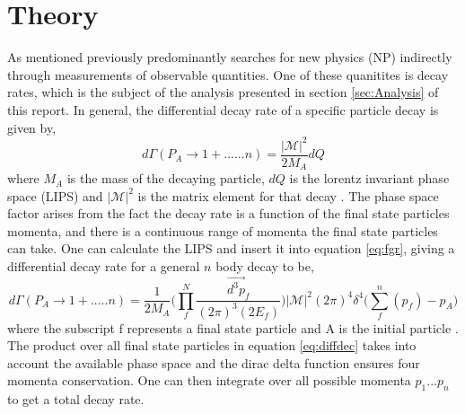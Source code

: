 
\section{Theory}
\label{sec:Theory}


As mentioned previously \lhcb predominantly searches for new physics (NP) indirectly through measurements of observable quantities.  One of these quanitites is decay rates, which is the subject of the analysis presented in section \ref{sec:Analysis} of this report.  In general, the differential decay rate of a specific particle decay is given by,
\begin{equation}
  \label{eq:fgr}
  d\Gamma(P_A\to1 + ......n) = \frac{|\mathscr{M}|^2}{2M_A}dQ
\end{equation}
where $M_A$ is the mass of the decaying particle, $dQ$ is the lorentz invariant phase space (LIPS) and $|\mathscr{M}|^2$ is the matrix element for that decay \cite{halzen1984quarks}.  The phase space factor arises from the fact the decay rate is a function of the final state particles momenta, and there is a continuous range of momenta the final state particles can take.  One can calculate the LIPS and insert it into equation \ref{eq:fgr}, giving a differential decay rate for a general $n$ body decay to be,
\begin{equation}
  \label{eq:diffdec}
  d\Gamma(P_A \to 1+ .....n) = \frac{1}{2M_A}\bigg(\prod_{f}^{N}\frac{\vec{d^3p}_f}{(2\pi)^3(2E_f)}\bigg)|\mathscr{M}|^2(2\pi)^4\delta^4\bigg(\sum_{f}^n(p_f)-p_A\bigg)
\end{equation}
where the subscript f represents a final state particle and A is the initial particle \cite{halzen1984quarks}. The product over all final state particles in equation \ref{eq:diffdec} takes into account the available phase space and the dirac delta function ensures four momenta conservation.  One can then integrate over all possible momenta $p_1...p_n$ to get a total decay rate.

